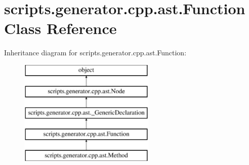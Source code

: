 \hypertarget{classscripts_1_1generator_1_1cpp_1_1ast_1_1_function}{}\section{scripts.\+generator.\+cpp.\+ast.\+Function Class Reference}
\label{classscripts_1_1generator_1_1cpp_1_1ast_1_1_function}
Inheritance diagram for scripts.\+generator.\+cpp.\+ast.\+Function\+:\begin{figure}[H]
\begin{center}
\leavevmode
\includegraphics[height=5.000000cm]{d8/dc2/classscripts_1_1generator_1_1cpp_1_1ast_1_1_function}
\end{center}
\end{figure}
